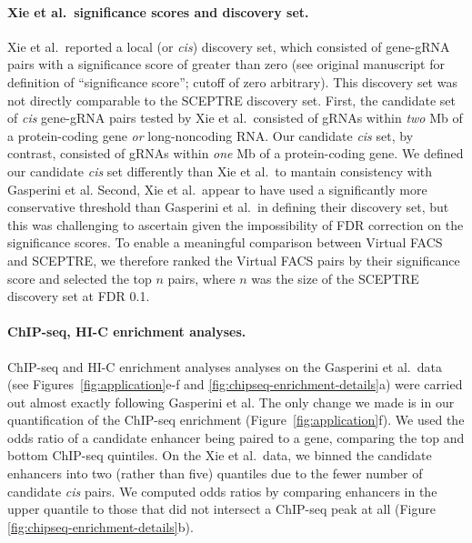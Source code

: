 \documentclass{article}
\begin{document}
\paragraph{Xie et al.\ significance scores and  discovery set.} Xie et al.\ reported a local (or \textit{cis}) discovery set, which consisted of gene-gRNA pairs with a significance score of greater than zero (see original manuscript for definition of ``significance score''\cite{Xie2019}; cutoff of zero arbitrary). This discovery set was not directly comparable to the SCEPTRE discovery set. First, the candidate set of \textit{cis} gene-gRNA pairs tested by Xie et al.\ consisted of gRNAs within \textit{two} Mb of a protein-coding gene \textit{or} long-noncoding RNA. Our candidate \textit{cis} set, by contrast, consisted of gRNAs within \textit{one} Mb of a protein-coding gene. We defined our candidate \textit{cis} set differently than Xie et al.\ to mantain consistency with Gasperini et al. Second, Xie et al.\ appear to have used a significantly more conservative threshold than Gasperini et al.\ in defining their discovery set, but this was challenging to ascertain given the impossibility of FDR correction on the significance scores. To enable a meaningful comparison between Virtual FACS and SCEPTRE, we therefore ranked the Virtual FACS pairs by their significance score and selected the top $n$ pairs, where $n$ was the size of the SCEPTRE discovery set at FDR 0.1. 

\paragraph{ChIP-seq, HI-C enrichment analyses.}

ChIP-seq and HI-C enrichment analyses analyses on the Gasperini et al.\ data (see Figures~\ref{fig:application}e-f and \ref{fig:chipseq-enrichment-details}a) were carried out almost exactly following Gasperini et al. The only change we made is in our quantification of the ChIP-seq enrichment (Figure~\ref{fig:application}f). We used the odds ratio of a candidate enhancer being paired to a gene, comparing the top and bottom ChIP-seq quintiles. On the Xie et al.\ data, we binned the candidate enhancers into two (rather than five) quantiles due to the fewer number of candidate \textit{cis} pairs. We computed odds ratios by comparing enhancers in the upper quantile to those that did not intersect a ChIP-seq peak at all (Figure \ref{fig:chipseq-enrichment-details}b).


\end{document}

